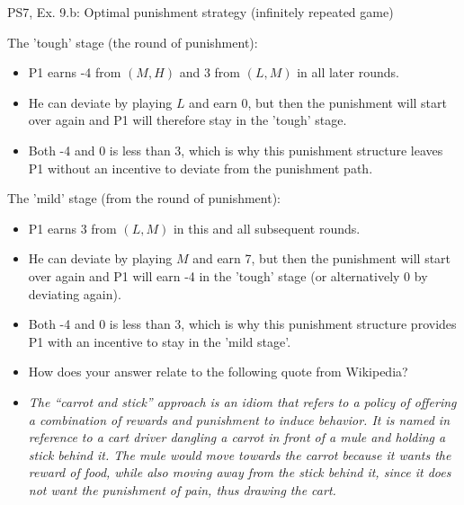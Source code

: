 \begin{frame}{PS7, Ex. 9.b: Optimal punishment strategy (infinitely repeated game)}
  \begin{multicols}{2}
    The 'tough' stage (the  round of punishment):\vspace{-4pt}
    \begin{itemize}
      \item P1 earns -4 from $(M, H)$ and 3 from $(L, M)$ in all later rounds.
      \item He can deviate by playing $L$ and earn 0, but then the punishment will start over again and P1 will therefore stay in the 'tough' stage.
      \item Both -4 and 0 is less than 3, which is why this punishment structure leaves P1 without an incentive to deviate from the punishment path.
    \end{itemize}
    \vfill\null\columnbreak
    The 'mild' stage (from the  round of punishment):\vspace{-4pt}
    \begin{itemize}
      \item P1 earns 3 from $(L, M)$ in this and all subsequent rounds.
      \item He can deviate by playing $M$ and earn 7, but then the punishment will start over again and P1 will earn -4 in the 'tough' stage (or alternatively 0 by deviating again).
      \item Both -4 and 0 is less than 3, which is why this punishment structure provides P1 with an incentive to stay in the 'mild stage'.
    \end{itemize}
    \vfill\null
  \end{multicols}
    \vspace{-24pt}
    \begin{itemize}
      \item[(b)] How does your answer relate to the following quote from Wikipedia?
      \item[] \textit{The “carrot and stick” approach is an idiom that refers to a policy of offering a combination of rewards and punishment to induce behavior. It is named in reference to a cart driver dangling a carrot in front of a mule and holding a stick behind it. The mule would move towards the carrot because it wants the reward of food, while also moving away from the stick behind it, since it does not want the punishment of pain, thus drawing the cart.}
    \end{itemize}
\end{frame}
